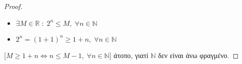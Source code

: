 \begin{enumerate}
\begin{proof}
      \begin{minipage}{0.35\textwidth}
        \begin{itemize}
          \item $ \exists M \in \mathbb{R} \; : \; 2^{n} \leq M, \; 
            \forall n \in \mathbb{N} $ \hfill {}
          \item $ 2^{n}=(1+1)^{n} \geq 1+n, \; \forall n \in 
            \mathbb{N} $ \hfill {}
        \end{itemize}    
      \end{minipage}
      [$ M \geq 1+n \Leftrightarrow n \leq M-1, \; 
      \forall n \in \mathbb{N} $] 
      άτοπο, γιατί $ \mathbb{N} $ δεν είναι άνω φραγμένο.
    \end{proof}






\end{enumerate}
